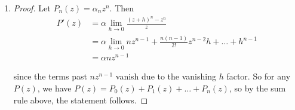 \documentclass[11pt, letterpaper]{article}
\begin{document}
\begin{enumerate}
\begin{enumerate}
    \item \begin{proof}
      \begin{align*}
        (fg)'(z) 
        &= \lim_{h \rightarrow 0}\frac{f(z+h)g(z+h) - f(z)g(z)}{h} \\
        &= \lim_{h \rightarrow 0}\frac{f(z+h)g(z+h) - f(z+h)g(z) + f(z+h)g(z) - f(z)g(z)}{h} \\ 
        &= \lim_{h \rightarrow 0}\left(\frac{f(z+h)(g(z+h)-g(z))}{h} + \frac{g(z)(f(z+h)-f(z))}{h}\right) \\ 
        &= \lim_{h \rightarrow 0}f(z+h)\frac{g(z+h)-g(z)}{h} + \lim_{h \rightarrow 0}g(z)\frac{f(z+h)-f(z)}{h}  \\ 
        &= f(z)g'(z) + g(z)f'(z)
      \end{align*}
    \end{proof}

    \item \begin{proof}
      From the hint, we have $(1/g)' = -\frac{g'(z)}{(g(z))^2}$. So, by the product rule,
      \begin{align*}
        \left(\frac{f}{g}\right)'(z) = \left(f \cdot \frac{1}{g}\right)'(z)
        &= - \frac{f(z)g'(z)}{(g(z))^2} + \frac{f'(z)}{g(z)} \\
        &= \frac{f'(z)g(z) - f(z)g'(z)}{(g(z))^2}
      \end{align*}
    \end{proof}
  \end{enumerate}

  \item \begin{proof}
    Let $P_n(z) = \alpha_n z^n$. Then
    \begin{align*}
      P'(z) &= \alpha \lim_{h \to 0} \frac{(z + h)^n - z^n}{z} \\
      &= \alpha \lim_{h \to 0} nz^{n - 1} + \frac{n(n - 1)}{2!}z^{n - 2}h + \dots + h^{n - 1} \\
      &= \alpha n z^{n - 1}
    \end{align*}

    since the terms past $nz^{n - 1}$ vanish due to the vanishing $h$ factor. So for any $P(z)$, we have $P(z) = P_0(z) + P_1(z) + \dots + P_n(z)$, so by the sum rule above, the statement follows.
  \end{proof}


\end{enumerate}
\end{document}
